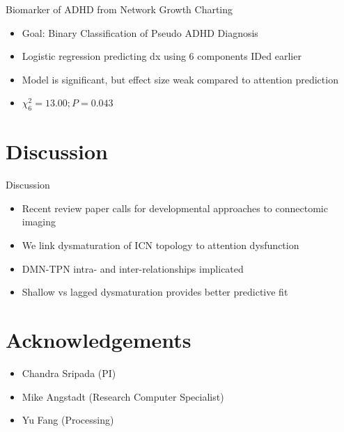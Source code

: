\documentclass[presentation]{beamer}
\begin{document}
\begin{frame}[label={sec:orgheadline24}]{Biomarker of ADHD from Network Growth Charting}
\begin{itemize}
\item Goal: Binary Classification of Pseudo ADHD Diagnosis
\item Logistic regression predicting dx using 6 components IDed earlier
\item Model is significant, but effect size weak compared to attention prediction
\item \(\chi^2_6 = 13.00; P = 0.043\)
\end{itemize}
\end{frame}
\section{Discussion}
\label{sec:orgheadline27}
\begin{frame}[label={sec:orgheadline26}]{Discussion}
\begin{itemize}
\item Recent review paper calls for developmental approaches to connectomic imaging
\item We link dysmaturation of ICN topology to attention dysfunction
\item DMN-TPN intra- and inter-relationships implicated
\item Shallow vs lagged dysmaturation provides better predictive fit
\end{itemize}
\end{frame}
\section{Acknowledgements}
\label{sec:orgheadline28}
\begin{itemize}
\item Chandra Sripada (PI)
\item Mike Angstadt (Research Computer Specialist)
\item Yu Fang (Processing)
\end{itemize}
\end{document}
